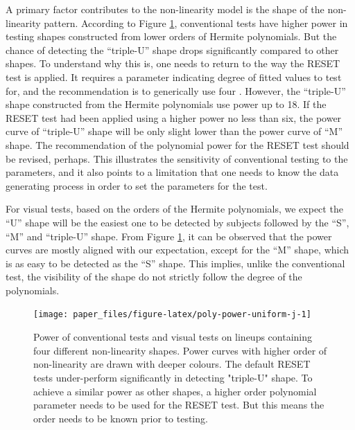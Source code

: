 \documentclass[]{interact}
\theoremstyle{plain}%
\theoremstyle{definition}
\theoremstyle{remark}
\begin{document}
A primary factor contributes to the non-linearity model is the shape of
the non-linearity pattern. According to Figure
\ref{fig:poly-power-uniform-j}, conventional tests have higher power in
testing shapes constructed from lower orders of Hermite polynomials. But
the chance of detecting the ``triple-U'' shape drops significantly
compared to other shapes. To understand why this is, one needs to return
to the way the RESET test is applied. It requires a parameter indicating
degree of fitted values to test for, and the recommendation is to
generically use four \citep{ramsey_tests_1969}. However, the
``triple-U'' shape constructed from the Hermite polynomials use power up
to 18. If the RESET test had been applied using a higher power no less
than six, the power curve of ``triple-U'' shape will be only slight
lower than the power curve of ``M'' shape. The recommendation of the
polynomial power for the RESET test should be revised, perhaps. This
illustrates the sensitivity of conventional testing to the parameters,
and it also points to a limitation that one needs to know the data
generating process in order to set the parameters for the test.

For visual tests, based on the orders of the Hermite polynomials, we
expect the ``U'' shape will be the easiest one to be detected by
subjects followed by the ``S'', ``M'' and ``triple-U'' shape. From
Figure \ref{fig:poly-power-uniform-j}, it can be observed that the power
curves are mostly aligned with our expectation, except for the ``M''
shape, which is as easy to be detected as the ``S'' shape. This implies,
unlike the conventional test, the visibility of the shape do not
strictly follow the degree of the polynomials.

\begin{figure}

{\centering \texttt{[image: paper\_files/figure-latex/poly-power-uniform-j-1]} 

}

\caption{Power of conventional tests and visual tests on lineups containing four different non-linearity shapes. Power curves with higher order of non-linearity are drawn with deeper colours. The default RESET tests under-perform significantly in detecting "triple-U" shape. To achieve a similar power as other shapes, a higher order polynomial parameter needs to be used for the RESET test. But this means the order needs to be known prior to testing.}\label{fig:poly-power-uniform-j}
\end{figure}
\end{document}
